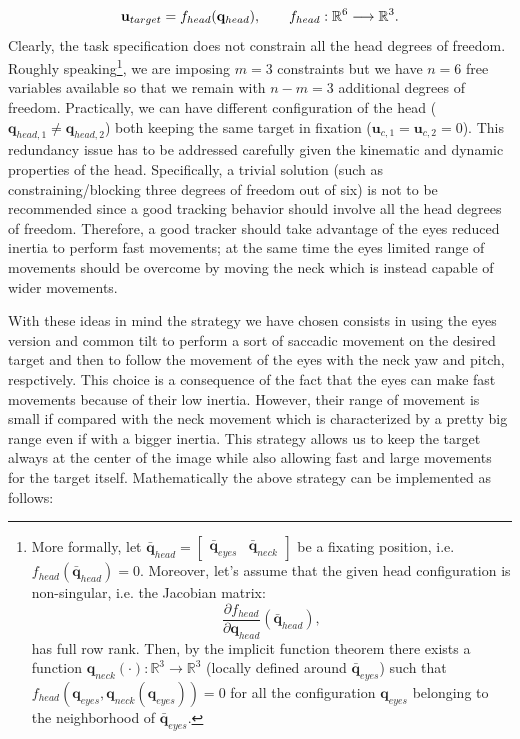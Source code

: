 \begin{eqnarray*}
\mathbf{u}_{target} = f_{head} (\mathbf q_{head}), \qquad f_{head} : \mathbb R^6 \longrightarrow \mathbb R^3.
\end{eqnarray*}
Clearly, the task specification does not constrain all the head degrees of freedom. Roughly speaking\footnote{More formally, let $\bar {\mathbf q}_{head} = \begin{bmatrix} \bar {\mathbf q}_{eyes} & \bar {\mathbf q}_{neck} \end{bmatrix}$ be a fixating position, i.e. $f_{head}(\bar {\mathbf q}_{head}) = 0$. Moreover, let's assume that the given head configuration is non-singular, i.e. the Jacobian matrix: $$\frac{\partial f_{head}}{\partial \mathbf q_{head}}(\bar {\mathbf q}_{head}),$$ has full row rank. Then, by the implicit function theorem there exists a function $\mathbf q_{neck}(\cdot): \mathbb R^3 \longrightarrow \mathbb R^3$ (locally defined around $\bar {\mathbf q}_{eyes}$) such that $f_{head}({\mathbf q}_{eyes}, {\mathbf q}_{neck} ({\mathbf q}_{eyes}) ) = 0$ for all the configuration ${\mathbf q}_{eyes}$ belonging to the neighborhood of $\bar {\mathbf q}_{eyes}$.}, we are imposing $m=3$ constraints but we have $n=6$ free variables available so that we remain with $n-m=3$ additional degrees of freedom. Practically, we can have different configuration of the head ($\mathbf q_{head,1} \neq \mathbf q_{head,2}$) both keeping the same target in fixation (${\mathbf u}_{c,1} = {\mathbf u}_{c,2} = 0$). This redundancy issue has to be addressed carefully given the kinematic and dynamic properties of the head. Specifically, a trivial solution (such as constraining/blocking three degrees of freedom out of six) is not to be recommended since a good tracking behavior should involve all the  head degrees of freedom. Therefore, a good tracker should take advantage of the eyes reduced inertia to perform fast movements; at the same time the eyes limited range of movements should be overcome by moving the neck which is instead capable of wider movements.

With these ideas in mind the strategy we have chosen consists in using the eyes version and common tilt to perform a sort of saccadic movement on the desired target and then to follow the movement of the eyes with the neck yaw and pitch, respctively. This choice is a consequence of the fact that the eyes can make fast movements because of their low inertia. However, their range of movement is small if compared with the neck movement which is characterized by a pretty big range even if with a bigger inertia. This strategy allows us to keep the target always at the center of the image while also allowing fast and large movements for the target itself. Mathematically the above strategy can be implemented as follows:

